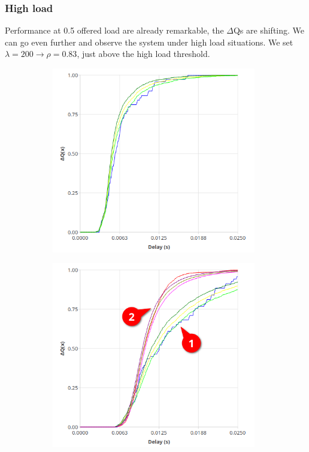     
\subsubsection{High load}
    Performance at 0.5 offered load are already remarkable, the $\Delta$Qs are shifting.    We can go even further and observe the system under high load situations. We set $\lambda = 200 \rightarrow \rho = 0.83$, just above the high load threshold.
    
       \begin{figure}[H]
            \centering
            \begin{subfigure}{.5\textwidth}
                \centering
                \includegraphics[width=0.98\textwidth]{img/overload_2/250_worker.png}
                \label{fig:high_load_1}
            \end{subfigure}%
            \begin{subfigure}{.5\textwidth}
                \centering
                \includegraphics[width =0.98\textwidth]{img/overload_2/250_probe2.png}

\end{subfigure}
\end{figure}
